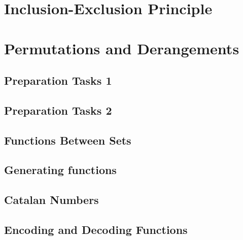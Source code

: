 \documentclass{article}
\newcommand{\includelectureSub}[1]{%
  \begingroup
    \renewcommand{\section}{\subsection}%
  \endgroup
}
\newcommand{\includelectureNoHeader}[1]{%
  \begingroup
    \let\maketitle\relax%
  \endgroup
}
\begin{document}
\section{Inclusion-Exclusion Principle}
\includelectureNoHeader{Inclusion_Exclusion}

\section{Permutations and Derangements}
\includelectureSub{Permutations_Derangements}

\section{Preparation Tasks 1}
\includelectureSub{Preparation_tasks1}

\section{Preparation Tasks 2}
\includelectureSub{Preparation_tasks2}

\section{Functions Between Sets}
\includelectureNoHeader{Functions_between_sets}

\section{Generating functions}
\includelectureSub{Generating_functions}

\section{Catalan Numbers}
\includelectureSub{Catalan_Numbers}

\section{Encoding and Decoding Functions}
\includelectureSub{Codes}
\end{document}
